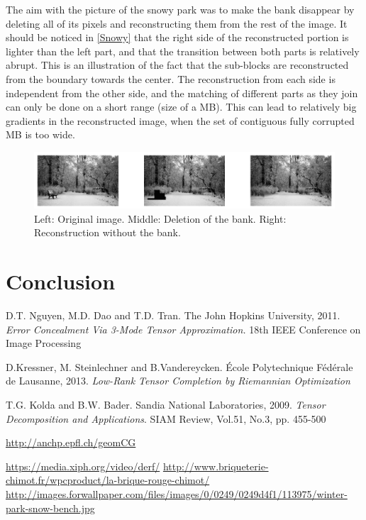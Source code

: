 \documentclass[a4paper, 11pt]{article} %
\begin{document}
The aim with the picture of the snowy park was to make the bank disappear by deleting all of its pixels and reconstructing them from the rest of the image. It should be noticed in \autoref{Snowy} that the right side of the reconstructed portion is lighter than the left part, and that the transition between both parts is relatively abrupt. This is an illustration of the fact that the sub-blocks are reconstructed from the boundary towards the center. The reconstruction from each side is independent from the other side, and the matching of different parts as they join can only be done on a short range (size of a MB). This can lead to relatively big gradients in the reconstructed image, when the set of contiguous fully corrupted MB is too wide.  
\begin{figure}[h!]
\centering
\includegraphics[scale=0.9]{InpaintingSnow}
\caption{Left: Original image. Middle: Deletion of the bank. Right: Reconstruction without the bank.\label{Snowy}}
\end{figure}




\break
\section{Conclusion}
\break
\begin{thebibliography}{9}

D.T. Nguyen, M.D. Dao and T.D. Tran. {The John Hopkins University}, 2011.
\textit{Error Concealment Via 3-Mode Tensor Approximation.} 18th IEEE Conference on Image Processing


D.Kressner, M. Steinlechner and B.Vandereycken.{ \'Ecole Polytechnique F\'ed\'erale de Lausanne}, 2013. \textit{Low-Rank Tensor Completion by Riemannian Optimization}


  T.G. Kolda and B.W. Bader. {Sandia National Laboratories}, 2009.
\textit{Tensor Decomposition and Applications}. SIAM Review, Vol.51, No.3, pp. 455-500

 \url{http://anchp.epfl.ch/geomCG}

 \url{https://media.xiph.org/video/derf/}
 \url{http://www.briqueterie-chimot.fr/wpcproduct/la-brique-rouge-chimot/}
 \url{http://images.forwallpaper.com/files/images/0/0249/0249d4f1/113975/winter-park-snow-bench.jpg}
\end{thebibliography}
\end{document}
